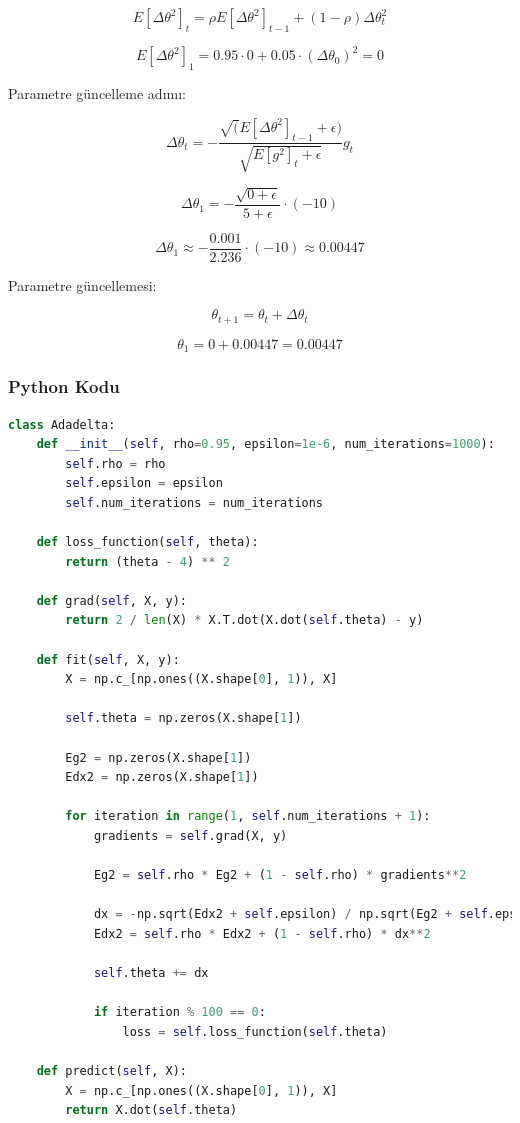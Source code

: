 \[ E[\Delta \theta^2]_t = \rho E[\Delta \theta^2]_{t-1} + (1 - \rho) \Delta \theta_{t}^2 \]

\[ E[\Delta \theta^2]_1 = 0.95 \cdot 0 + 0.05 \cdot (\Delta \theta_0)^2 = 0 \]

Parametre güncelleme adımı:

\[ \Delta \theta_t = - \frac{\sqrt(E[\Delta \theta^2]_{t-1} + \epsilon)}{\sqrt{E[g^2]_t + \epsilon}} g_t \]

\[ \Delta \theta_1 = - \frac{\sqrt{0 + \epsilon}}{5 + \epsilon} \cdot (-10) \]

\[ \Delta \theta_1 \approx - \frac{0.001}{2.236} \cdot (-10) \approx 0.00447 \]

Parametre güncellemesi:

\[ \theta_{t+1} = \theta_t + \Delta \theta_t \]

\[ \theta_1 = 0 + 0.00447 = 0.00447\]

\subsubsection{Python Kodu}

\begin{lstlisting}[language=Python]
class Adadelta:
    def __init__(self, rho=0.95, epsilon=1e-6, num_iterations=1000):
        self.rho = rho
        self.epsilon = epsilon
        self.num_iterations = num_iterations

    def loss_function(self, theta):
        return (theta - 4) ** 2

    def grad(self, X, y):
        return 2 / len(X) * X.T.dot(X.dot(self.theta) - y)    

    def fit(self, X, y):
        X = np.c_[np.ones((X.shape[0], 1)), X]

        self.theta = np.zeros(X.shape[1])

        Eg2 = np.zeros(X.shape[1])
        Edx2 = np.zeros(X.shape[1])

        for iteration in range(1, self.num_iterations + 1):
            gradients = self.grad(X, y)

            Eg2 = self.rho * Eg2 + (1 - self.rho) * gradients**2

            dx = -np.sqrt(Edx2 + self.epsilon) / np.sqrt(Eg2 + self.epsilon) * gradients
            Edx2 = self.rho * Edx2 + (1 - self.rho) * dx**2

            self.theta += dx

            if iteration % 100 == 0:
                loss = self.loss_function(self.theta)

    def predict(self, X):
        X = np.c_[np.ones((X.shape[0], 1)), X]
        return X.dot(self.theta)
\end{lstlisting}

